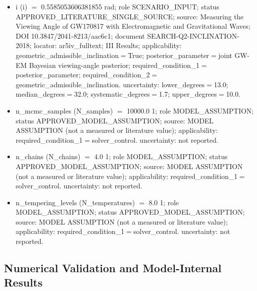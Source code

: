 \documentclass[11pt]{article}
\begin{document}
\begin{itemize}
\item i (i) \ensuremath{=} 0.5585053606381855 rad; role SCENARIO\_\allowbreak{}INPUT; status APPROVED\_\allowbreak{}LITERATURE\_\allowbreak{}SINGLE\_\allowbreak{}SOURCE; source: Measuring the Viewing Angle of GW170817 with Electromagnetic and Gravitational Waves; DOI 10.3847/\allowbreak{}2041-8213/\allowbreak{}aac6c1; document SEARCH-Q2-INCLINATION-2018; locator: ar5iv\_\allowbreak{}fulltext; III Results; applicability: geometric\_\allowbreak{}admissible\_\allowbreak{}inclination\ensuremath{=}True; posterior\_\allowbreak{}parameter\ensuremath{=}joint GW-EM Bayesian viewing-angle posterior; required\_\allowbreak{}condition\_\allowbreak{}1\ensuremath{=}posterior\_\allowbreak{}parameter; required\_\allowbreak{}condition\_\allowbreak{}2\ensuremath{=}geometric\_\allowbreak{}admissible\_\allowbreak{}inclination. uncertainty: lower\_\allowbreak{}degrees\ensuremath{=}13.0; median\_\allowbreak{}degrees\ensuremath{=}32.0; systematic\_\allowbreak{}degrees\ensuremath{=}1.7; upper\_\allowbreak{}degrees\ensuremath{=}10.0.
\item n\_\allowbreak{}mcmc\_\allowbreak{}samples (N\_\allowbreak{}samples) \ensuremath{=} 10000.0 1; role MODEL\_\allowbreak{}ASSUMPTION; status APPROVED\_\allowbreak{}MODEL\_\allowbreak{}ASSUMPTION; source: MODEL ASSUMPTION (not a measured or literature value); applicability: required\_\allowbreak{}condition\_\allowbreak{}1\ensuremath{=}solver\_\allowbreak{}control. uncertainty: not reported.
\item n\_\allowbreak{}chains (N\_\allowbreak{}chains) \ensuremath{=} 4.0 1; role MODEL\_\allowbreak{}ASSUMPTION; status APPROVED\_\allowbreak{}MODEL\_\allowbreak{}ASSUMPTION; source: MODEL ASSUMPTION (not a measured or literature value); applicability: required\_\allowbreak{}condition\_\allowbreak{}1\ensuremath{=}solver\_\allowbreak{}control. uncertainty: not reported.
\item n\_\allowbreak{}tempering\_\allowbreak{}levels (N\_\allowbreak{}temperatures) \ensuremath{=} 8.0 1; role MODEL\_\allowbreak{}ASSUMPTION; status APPROVED\_\allowbreak{}MODEL\_\allowbreak{}ASSUMPTION; source: MODEL ASSUMPTION (not a measured or literature value); applicability: required\_\allowbreak{}condition\_\allowbreak{}1\ensuremath{=}solver\_\allowbreak{}control. uncertainty: not reported.
\end{itemize}

\subsection{Numerical Validation and Model-Internal Results}
\end{document}
